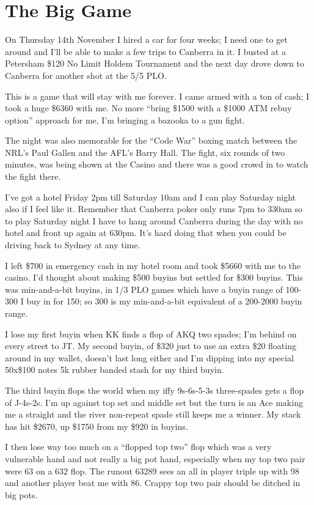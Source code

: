 \chapter{The Big Game}

On Thursday 14th November I hired a car for four weeks; I need one to
get around and I'll be able to make a few trips to Canberra in it. I
busted at a Petersham \$120 No Limit Holdem Tournament and the next
day drove down to Canberra for another shot at the 5/5 PLO.

This is a game that will stay with me forever. I came armed with a ton
of cash; I took a huge \$6360 with me. No more ``bring \$1500 with a
\$1000 ATM rebuy option'' approach for me, I'm bringing a bazooka to a
gun fight.

The night was also memorable for the ``Code War'' boxing match between
the NRL's Paul Gallen and the AFL's Barry Hall. The fight, six rounds
of two minutes, was being shown at the Casino and there was a good
crowd in to watch the fight there.

I've got a hotel Friday 2pm till Saturday 10am and I can play Saturday
night also if I feel like it. Remember that Canberra poker only runs
7pm to 330am so to play Saturday night I have to hang around Canberra
during the day with no hotel and front up again at 630pm. It's hard
doing that when you could be driving back to Sydney at any time.

I left \$700 in emergency cash in my hotel room and took \$5660 with
me to the casino. I'd thought about making \$500 buyins but settled
for \$300 buyins. This was min-and-a-bit buyins, in 1/3 PLO
games which have a buyin range of 100-300 I buy in for 150; so 300 is
my min-and-a-bit equivalent of a 200-2000 buyin range.

I lose my first buyin when KK finds a flop of AKQ two spades; I'm
behind on every street to JT. My second buyin, of \$320 just to use an
extra \$20 floating around in my wallet, doesn't last long either and
I'm dipping into my special 50x\$100 notes 5k rubber banded stash for
my third buyin.

The third buyin flops the world when my iffy 9s-6s-5-3s three-spades gets a
flop of J-4s-2s. I'm up against top set and middle set but the turn is
an Ace making me a straight and the river non-repeat spade still keeps
me a winner. My stack has hit \$2670, up \$1750 from my \$920 in
buyins.

I then lose way too much on a ``flopped top two'' flop which was a
very vulnerable hand and not really a big pot hand, especially when my
top two pair were 63 on a 632 flop. The runout 63289 sees an all in
player triple up with 98 and another player beat me with 86. Crappy
top two pair should be ditched in big pots.

